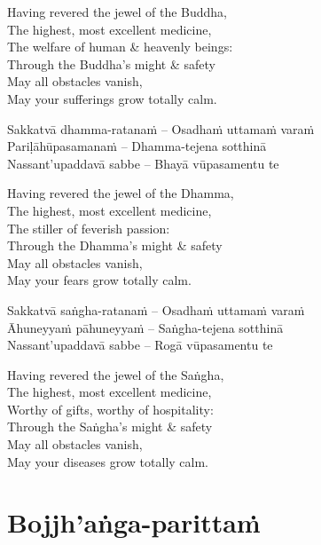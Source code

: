 \begin{english-verses}
  Having revered the jewel of the Buddha,\\
  The highest, most excellent medicine,\\
  The welfare of human \& heavenly beings:\\
  Through the Buddha's might \& safety\\
  May all obstacles vanish,\\
  May your sufferings grow totally calm.
\end{english-verses}

Sakkatvā dhamma-ratanaṁ – Osadhaṁ uttamaṁ varaṁ\\
Pariḷāhūpasamanaṁ – Dhamma-tejena sotthinā\\
Nassant'upaddavā sabbe – Bhayā vūpasamentu te

\begin{english-verses}
  Having revered the jewel of the Dhamma,\\
  The highest, most excellent medicine,\\
  The stiller of feverish passion:\\
  Through the Dhamma's might \& safety\\
  May all obstacles vanish,\\
  May your fears grow totally calm.
\end{english-verses}

Sakkatvā saṅgha-ratanaṁ – Osadhaṁ uttamaṁ varaṁ\\
Āhuneyyaṁ pāhuneyyaṁ – Saṅgha-tejena sotthinā\\
Nassant'upaddavā sabbe – Rogā vūpasamentu te

\begin{english-verses}
  Having revered the jewel of the Saṅgha,\\
  The highest, most excellent medicine,\\
  Worthy of gifts, worthy of hospitality:\\
  Through the Saṅgha's might \& safety\\
  May all obstacles vanish,\\
  May your diseases grow totally calm.
\end{english-verses}

\suttaRef{[MJG]}

\section{Bojjh'aṅga-parittaṁ}
\label{bojjhana-parittam}

